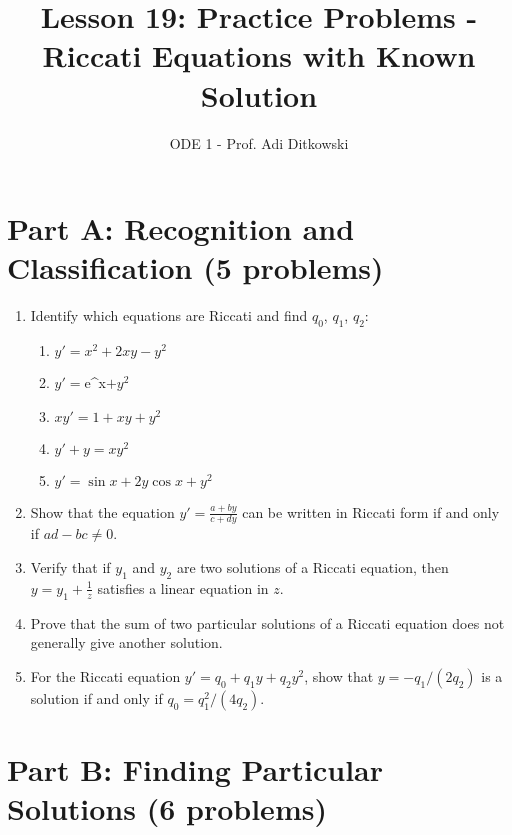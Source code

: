 \documentclass[12pt]{article}
\title{Lesson 19: Practice Problems - Riccati Equations with Known Solution}
\author{ODE 1 - Prof. Adi Ditkowski}
\date{}
\begin{document}
\maketitle

\section*{Part A: Recognition and Classification (5 problems)}

\begin{enumerate}
    \item Identify which equations are Riccati and find $q_0$, $q_1$, $q_2$:
    \begin{enumerate}[label=(\alph*)]
        \item $y' = x^2 + 2xy - y^2$
        \item $y' = $e^x$ + y^2$
        \item $xy' = 1 + xy + y^2$
        \item $y' + y = xy^2$
        \item $y' = \sin x + 2y\cos x + y^2$
    \end{enumerate}

    \item Show that the equation $y' = \frac{a + by}{c + dy}$ can be written in Riccati form if and only if $ad - bc \neq 0$.

    \item Verify that if $y_1$ and $y_2$ are two solutions of a Riccati equation, then $y = y_1 + \frac{1}{z}$ satisfies a linear equation in $z$.

    \item Prove that the sum of two particular solutions of a Riccati equation does not generally give another solution.

    \item For the Riccati equation $y' = q_0 + q_1y + q_2y^2$, show that $y = -q_1/(2q_2)$ is a solution if and only if $q_0 = q_1^2/(4q_2)$.
\end{enumerate}

\section*{Part B: Finding Particular Solutions (6 problems)}
\end{document}
